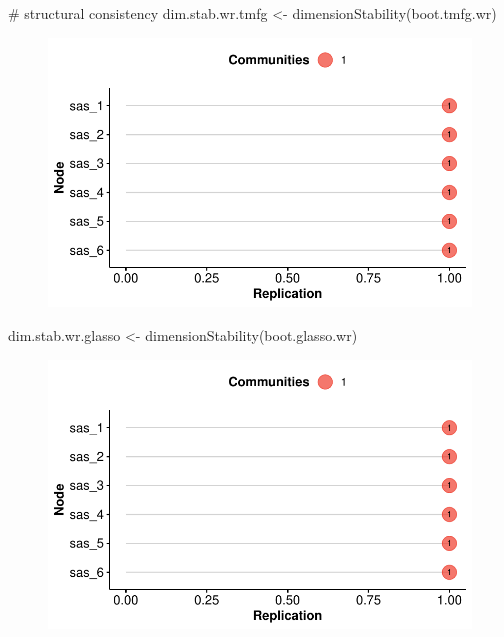 \documentclass[
  letterpaper,
  DIV=11,
  numbers=noendperiod]{scrreprt}
\newenvironment{Shaded}{\begin{snugshade}}{\end{snugshade}}
\newcommand{\CommentTok}[1]{\textcolor[rgb]{0.37,0.37,0.37}{#1}}
\newcommand{\FunctionTok}[1]{\textcolor[rgb]{0.28,0.35,0.67}{#1}}
\newcommand{\NormalTok}[1]{\textcolor[rgb]{0.00,0.23,0.31}{#1}}
\newcommand{\OtherTok}[1]{\textcolor[rgb]{0.00,0.23,0.31}{#1}}
\begin{document}
\begin{Shaded}
\begin{Highlighting}[]
\CommentTok{\# structural consistency}
\NormalTok{dim.stab.wr.tmfg }\OtherTok{\textless{}{-}} \FunctionTok{dimensionStability}\NormalTok{(boot.tmfg.wr)}
\end{Highlighting}
\end{Shaded}

\begin{figure}[H]

{\centering \includegraphics{03_dimensionality-analysis_files/figure-pdf/structural-consistency-wr-1.pdf}

}

\end{figure}

\begin{Shaded}
\begin{Highlighting}[]
\NormalTok{dim.stab.wr.glasso }\OtherTok{\textless{}{-}} \FunctionTok{dimensionStability}\NormalTok{(boot.glasso.wr)}
\end{Highlighting}
\end{Shaded}

\begin{figure}[H]

{\centering \includegraphics{03_dimensionality-analysis_files/figure-pdf/structural-consistency-wr-2.pdf}

}

\end{figure}
\end{document}
